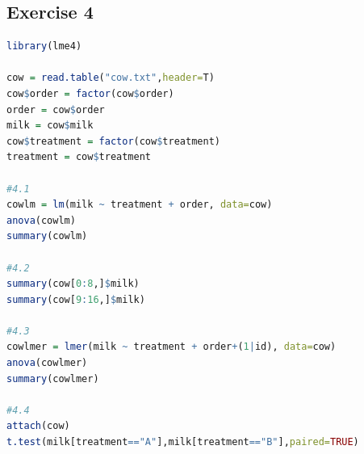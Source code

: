 \documentclass{article}
\begin{document}
    \subsection{Exercise 4}\label{sec:RE4}
      \begin{lstlisting}[language=R]
library(lme4)

cow = read.table("cow.txt",header=T)
cow$order = factor(cow$order)
order = cow$order
milk = cow$milk
cow$treatment = factor(cow$treatment)
treatment = cow$treatment

#4.1
cowlm = lm(milk ~ treatment + order, data=cow)
anova(cowlm)
summary(cowlm)

#4.2
summary(cow[0:8,]$milk)
summary(cow[9:16,]$milk)

#4.3
cowlmer = lmer(milk ~ treatment + order+(1|id), data=cow)
anova(cowlmer)
summary(cowlmer)

#4.4
attach(cow)
t.test(milk[treatment=="A"],milk[treatment=="B"],paired=TRUE)

      \end{lstlisting}
\end{document}
